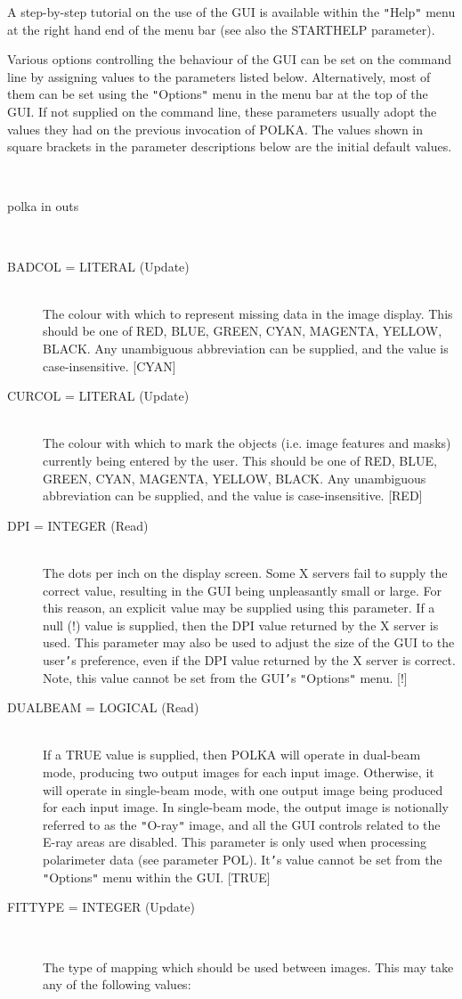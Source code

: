 \documentclass[twoside,11pt]{article}
\renewcommand{\_}{\texttt{\symbol{95}}}
\newcommand{\sstusage}[1]{\item[Usage:] \mbox{}
\\[1.3ex]{\raggedright \ssttt #1}}
\newcommand{\sstparameters}[1]{
   \item[Parameters:] \mbox{} \\
   \vspace{-3.5ex}
   \begin{description}
      #1
   \end{description}
}
\newcommand{\sstsubsection}[1]{ \item[{#1}] \mbox{} \\}
\newcommand{\sstusage}[1]{\item[Usage:]
      \begin{description}
         {\ssttt #1}
      \end{description}
      \\
   }
\newcommand{\sstparameters}[1]{
      \item[Parameters:] \\
      \begin{description}
         #1
      \end{description}
      \\
   }
\newcommand{\sstsubsection}[1]{\item[{#1}]}
\begin{document}
{{      A step-by-step tutorial on the use of the GUI is available within the
      {\tt "}Help{\tt "} menu at the right hand end of the menu bar (see also the STARTHELP
      parameter).

      Various options controlling the behaviour of the GUI can be set on the
      command line by assigning values to the parameters listed below.
      Alternatively, most of them can be set using the {\tt "}Options{\tt "} menu in the
      menu bar at the top of the GUI. If not supplied on the command line,
      these parameters usually adopt the values they had on the previous
      invocation of POLKA. The values shown in square brackets in the parameter
      descriptions below are the initial default values.
   }
   \sstusage{
      polka in out\_s
   }
   \sstparameters{
      \sstsubsection{
         BADCOL = LITERAL (Update)
      }{
         The colour with which to represent missing data in the image
         display. This should be one of RED, BLUE, GREEN, CYAN, MAGENTA,
         YELLOW, BLACK. Any unambiguous abbreviation can be supplied, and
         the value is case-insensitive. [CYAN]
      }
      \sstsubsection{
         CURCOL = LITERAL (Update)
      }{
         The colour with which to mark the objects (i.e. image features and
         masks) currently being entered by the user. This should be
         one of RED, BLUE, GREEN, CYAN, MAGENTA, YELLOW, BLACK. Any
         unambiguous abbreviation can be supplied, and the value is
         case-insensitive. [RED]
      }
      \sstsubsection{
         DPI = \_INTEGER (Read)
      }{
         The dots per inch on the display screen. Some X servers fail to
         supply the correct value, resulting in the GUI being unpleasantly
         small or large. For this reason, an explicit value may be supplied
         using this parameter. If a null (!) value is supplied, then the
         DPI value returned by the X server is used. This parameter may
         also be used to adjust the size of the GUI to the user{\tt '}s
         preference, even if the DPI value returned by the X server is correct.
         Note, this value cannot be set from the GUI{\tt '}s {\tt "}Options{\tt "} menu. [!]
      }
      \sstsubsection{
         DUALBEAM = \_LOGICAL (Read)
      }{
         If a TRUE value is supplied, then POLKA will operate in
         dual-beam mode, producing two output images for each input image.
         Otherwise, it will operate in single-beam mode, with one output
         image being produced for each input image. In single-beam mode,
         the output image is notionally referred to as the {\tt "}O-ray{\tt "} image,
         and all the GUI controls related to the E-ray areas are disabled.
         This parameter is only used when processing polarimeter data
         (see parameter POL). It{\tt '}s value cannot be set from the
         {\tt "}Options{\tt "} menu within the GUI. [TRUE]
      }
      \sstsubsection{
         FITTYPE = \_INTEGER (Update)
      }{
         The type of mapping which should be used between images. This
         may take any of the following values:

}}}
\end{document}
